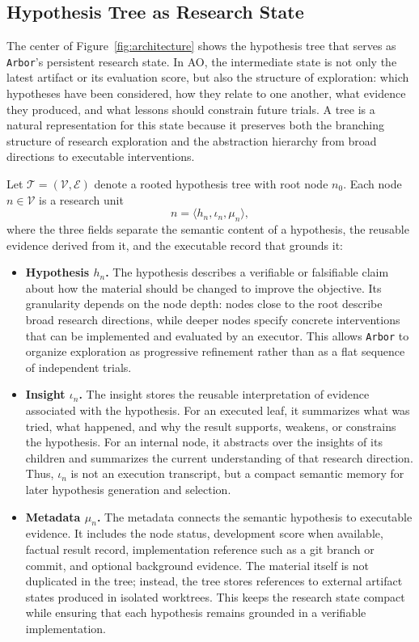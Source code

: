 \documentclass{llmxive}
\providecommand{\arbor}{\texttt{Arbor}}
\begin{document}
\subsection{Hypothesis Tree as Research State}
\label{sec:framework-htr}
The center of Figure~\ref{fig:architecture} shows the hypothesis tree that serves as \arbor{}'s persistent research state. In AO, the intermediate state is not only the latest artifact or its evaluation score, but also the structure of exploration: which hypotheses have been considered, how they relate to one another, what evidence they produced, and what lessons should constrain future trials. A tree is a natural representation for this state because it preserves both the branching structure of research exploration and the abstraction hierarchy from broad directions to executable interventions.

Let $\mathcal{T}=(\mathcal{V}, \mathcal{E})$ denote a rooted hypothesis tree with root node $n_0$. Each node $n\in\mathcal{V}$ is a research unit
\[
n = \langle h_n, \iota_n, \mu_n \rangle,
\]
where the three fields separate the semantic content of a hypothesis, the reusable evidence derived from it, and the executable record that grounds it:

\begin{itemize}
    \item \textbf{Hypothesis $h_n$.} 
    The hypothesis describes a verifiable or falsifiable claim about how the material should be changed to improve the objective. Its granularity depends on the node depth: nodes close to the root describe broad research directions, while deeper nodes specify concrete interventions that can be implemented and evaluated by an executor. This allows \arbor{} to organize exploration as progressive refinement rather than as a flat sequence of independent trials.

    \item \textbf{Insight $\iota_n$.} 
    The insight stores the reusable interpretation of evidence associated with the hypothesis. For an executed leaf, it summarizes what was tried, what happened, and why the result supports, weakens, or constrains the hypothesis. For an internal node, it abstracts over the insights of its children and summarizes the current understanding of that research direction. Thus, $\iota_n$ is not an execution transcript, but a compact semantic memory for later hypothesis generation and selection.

    \item \textbf{Metadata $\mu_n$.} 
    The metadata connects the semantic hypothesis to executable evidence. It includes the node status, development score when available, factual result record, implementation reference such as a git branch or commit, and optional background evidence. The material itself is not duplicated in the tree; instead, the tree stores references to external artifact states produced in isolated worktrees. This keeps the research state compact while ensuring that each hypothesis remains grounded in a verifiable implementation.
\end{itemize}
\end{document}

